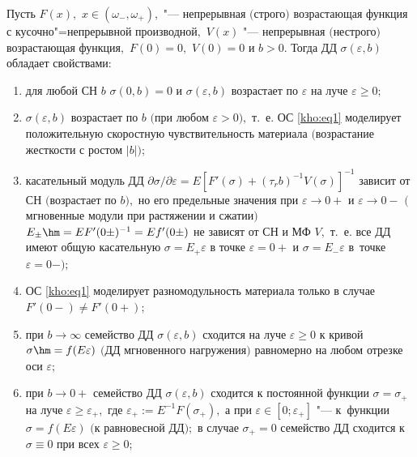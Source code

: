 \begin{theorem}[1] \label{kho:teo1} Пусть $F(x),$ $x\in(\omega_{-},\omega_{+}),$ "--- непрерывная $($строго$)$ возрастающая функция с кусочно"=непрерывной производной$,$ $V(x)$ "--- непрерывная $($нестрого$)$ возрастающая функция$,$ $F(0)=0,$ $V(0)=0$ и $b>0.$ Тогда ДД $\sigma(\varepsilon,b)$ обладает свойствами\/$:$

\begin{enumerate}

\item[\rm 1)] \hypertarget{kh:p1}{} для любой СН $b$ $\sigma(0,b)=0$ и $\sigma(\varepsilon,b)$ возрастает по $\varepsilon$ на луче $\varepsilon\ge0;$



\hypertarget{kh:p2}{} 

\item[\rm 2)] $\sigma(\varepsilon,b)$ возрастает по $b$ $($при любом $\varepsilon>0),$ т$.$~е$.$ ОС \eqref{kho:eq1} моделирует положительную скоростную чувствительность материала $($воз\-рас\-та\-ние жесткости с ростом $|b|);$



\hypertarget{kh:p3}{} 

\item[\rm 3)] касательный модуль ДД  $\partial\sigma/\partial\varepsilon=E[F'(\sigma)+(\tau_r b)^{-1}V(\sigma)]^{-1}$ зависит от СН $($возрастает по $b),$ но его предельные значения при $\varepsilon\to0+$ и $\varepsilon\to0-$ $($мгновенные модули при растяжении и сжатии$)$ $E_{\pm}\hm=EF'(0\pm)^{-1}=Ef'(0\pm)$ не зависят от СН и МФ $V,$ т$.$~е$.$ все ДД имеют общую касательную $\sigma=E_{+}\varepsilon$ в точке $\varepsilon=0+$ и $\sigma=E_{-}\varepsilon$ в~точке $\varepsilon=0-);$



\item[\rm 4)]  ОС \eqref{kho:eq1} моделирует разномодульность материала только в случае $F'(0-)\ne F'(0 +);$



\hypertarget{kh:p5}{} 

\item[\rm 5)]  при $b\to\infty$ семейство ДД $\sigma(\varepsilon,b)$ сходится на луче $\varepsilon\ge0$ к кривой $\sigma\hm=f(E\varepsilon)$ $($ДД мгновенного нагружения$)$ равномерно на любом отрезке оси $\varepsilon;$



\hypertarget{kh:p6}{} 

\item[\rm 6)] при $b\to0+$ семейство ДД $\sigma(\varepsilon,b)$ сходится к постоянной функции $\sigma=\sigma_{+}$ на луче $\varepsilon\ge\varepsilon_{+},$ где $\varepsilon_{+}:=E^{-1}F(\sigma_{+}),$ а при $\varepsilon\in[0;\varepsilon_{+}]$ "--- к~функции $\sigma=f(E\varepsilon)$ $($к равновесной ДД$);$ в случае $\sigma_{+}=0$ семейство ДД сходится к $\sigma\equiv0$ при всех $\varepsilon\ge0;$ 




\end{enumerate}
\end{theorem}
